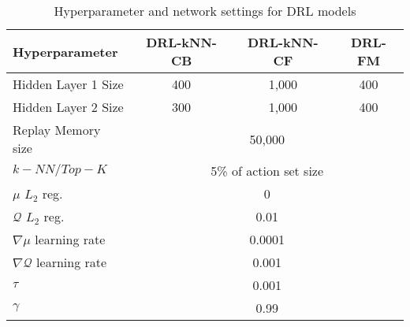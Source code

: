 \begin{table}[!htbp]
\centering
\begin{tabular}{ |l|c|c|c| }
  \hline
  \textbf{Hyperparameter}& \textbf{DRL-kNN-CB} & \textbf{DRL-kNN-CF} & \textbf{DRL-FM} \\
  \hline
  Hidden Layer 1 Size & 400 & 1,000 & 400 \\ \hline
  Hidden Layer 2 Size & 300 & 1,000 & 400 \\ \hline
  Replay Memory size & \multicolumn{3}{c|}{50,000} \\ \hline
  $k-NN/Top-K$ & \multicolumn{3}{c|}{5\% of action set size} \\ \hline
  $\mu$ $L_2$ reg. & \multicolumn{3}{c|}{0} \\ \hline
  $\mathcal{Q}$ $L_2$ reg. & \multicolumn{3}{c|}{0.01} \\ \hline
  $\nabla \mu$ learning rate & \multicolumn{3}{c|}{0.0001} \\ \hline
  $\nabla \mathcal{Q}$ learning rate & \multicolumn{3}{c|}{0.001} \\ \hline
  $\tau$ & \multicolumn{3}{c|}{0.001} \\
  $\gamma$ & \multicolumn{3}{c|}{0.99} \\
  \hline
\end{tabular}
\caption{Hyperparameter and network settings for DRL models}
\label{table:hyperparameters}
\end{table}

%

